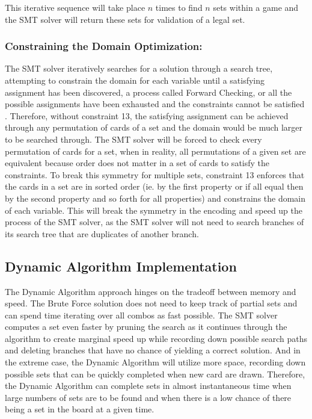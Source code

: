 \documentclass[pageno]{jpaper}
\begin{document}
This iterative sequence will take place $n$ times to find $n$ sets within a game and the SMT solver will return these sets for validation of a legal set. 

\subsubsection{Constraining the Domain Optimization:}

The SMT solver iteratively searches for a solution through a search tree, attempting to constrain the domain for each variable until a satisfying assignment has been discovered, a process called Forward Checking, or all the possible assignments have been exhausted and the constraints cannot be satisfied  \cite{search_from_AI}. Therefore, without constraint 13, the satisfying assignment can be achieved through any permutation of cards of a set and the domain would be much larger to be searched through. The SMT solver will be forced to check every permutation of cards for a set, when in reality, all permutations of a given set are equivalent because order does not matter in a set of cards to satisfy the constraints. To break this symmetry for multiple sets, constraint 13 enforces that the cards in a set are in sorted order (ie. by the first property or if all equal then by the second property and so forth for all properties) and constrains the domain of each variable. This will break the symmetry in the encoding and speed up the process of the SMT solver, as the SMT solver will not need to search branches of its search tree that are duplicates of another branch. 

\subsection{Dynamic Algorithm Implementation}

The Dynamic Algorithm approach hinges on the tradeoff between memory and speed. The Brute Force solution does not need to keep track of partial sets and can spend time iterating over all combos as fast possible. The SMT solver computes a set even faster by pruning the search as it continues through the algorithm to create marginal speed up while recording down possible search paths and deleting branches that have no chance of yielding a correct solution. And in the extreme case, the Dynamic Algorithm will utilize more space, recording down possible sets that can be quickly completed when new card are drawn. Therefore, the Dynamic Algorithm can complete sets in almost instantaneous time when large numbers of sets are to be found and when there is a low chance of there being a set in the board at a given time. 
\end{document}
